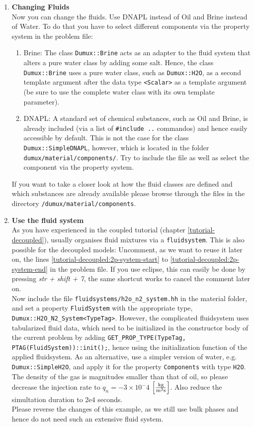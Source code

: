 \begin{enumerate}
\item \textbf{Changing Fluids} \\
Now you can change the fluids. Use DNAPL instead of Oil and Brine instead of Water. To do that you have to select different components via the property system in the problem file:
\begin{enumerate}
 \item Brine: The class \texttt{Dumux::Brine} acts as an adapter to the fluid system that alters a pure water class by adding some salt. Hence, the class \texttt{Dumux::Brine} uses a pure water class, such as \texttt{Dumux::H2O}, as a second template argument after the data type \texttt{<Scalar>} as a template argument (be sure to use the complete water class with its own template parameter).
 \item DNAPL: A standard set of chemical substances, such as Oil and Brine, is already included (via a list of \texttt{\#include ..} commandos) and hence easily accessible by default. This is not the case for the class \texttt{Dumux::SimpleDNAPL}, however, which is located in the folder \texttt{dumux/material/components/}. Try to include the file as well as select the component via the property system.
\end{enumerate}
If you want to take a closer look at how the fluid classes are defined and which substances are already available please browse through the files in the directory
\texttt{/dumux/material/components}.

\item \textbf{Use the \Dumux fluid system}\label{dec-ex1-fluidsystem} \\
As you have experienced in the coupled tutorial (chapter \ref{tutorial-decoupled}), \Dumux usually organises fluid mixtures via a \texttt{fluidsystem}. This is also possible for the decoupled models: Uncomment, as we want to reuse it later on, the lines \ref{tutorial-decoupled:2p-system-start} to \ref{tutorial-decoupled:2p-system-end} in the problem file. If you use eclipse, this can easily be done by pressing \textit{str + shift + 7}, the same shortcut works to cancel the comment later on.\\
Now include the file \texttt{fluidsystems/h2o\_n2\_system.hh} in the material folder, and set a property \texttt{FluidSystem} with the appropriate type, \texttt{Dumux::H2O\_N2\_System<TypeTag>}. However, the complicated fluidsystem uses tabularized fluid data, which need to be initialized in the constructor body of the current problem by adding \texttt{GET\_PROP\_TYPE(TypeTag, PTAG(FluidSystem))::init();}, hence using the initialization function of the applied fluidsystem. As an alternative, use a simpler version of water, e.g. \texttt{Dumux::SimpleH2O}, and apply it for the property \texttt{Components} with type \texttt{H2O}. The density of the gas is magnitudes smaller than that of oil, so please decrease the injection rate to $q_n = -3 \times 10^-4$ $\left[\frac{\textnormal{kg}}{\textnormal{m}^2 \textnormal{s}}\right]$. Also reduce the simultation duration to 2e4 seconds.\\
Please reverse the changes of this example, as we still use bulk phases and hence do not need such an extensive fluid system.
 

\end{enumerate}
